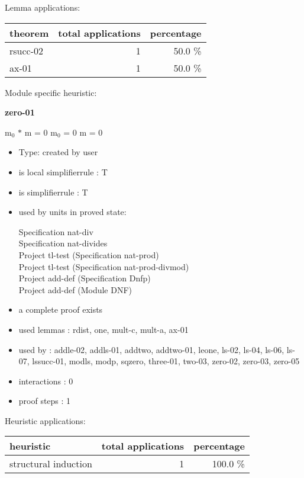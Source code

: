 \documentclass[a4paper]{article}
\begin{document}
Lemma applications:

\begin{supertabular}{l|r|r}
theorem	        & total applications & percentage \\ \hline
rsucc-02 & 1 & 50.0 \% \\
ax-01 & 1 & 50.0 \% \\

\end{supertabular}

Module specific heuristic:

\pagebreak

{\LARGE\bf zero-01}\label{lemma-zero-01}

\medskip

 \Fol $\mbox{m}_{0}$ $*$ m = 0 \Equiv $\mbox{m}_{0}$ = 0 \Or m = 0

\begin{itemize}

\item Type: created by user

\item is local simplifierrule : T
\item is simplifierrule : T
\item used by units in proved state:

Specification nat-div \\
Specification nat-divides \\
Project tl-test (Specification nat-prod) \\
Project tl-test (Specification nat-prod-divmod) \\
Project add-def (Specification Dnfp) \\
Project add-def (Module DNF)
\item       a complete proof exists
\item       used lemmas  : rdist, one, mult-c, mult-a, ax-01
\item       used by      : addle-02, addls-01, addtwo, addtwo-01, leone, ls-02, ls-04, ls-06, ls-07, lssucc-01, modls, modp, sqzero, three-01, two-03, zero-02, zero-03, zero-05
\item       interactions : 0
\item       proof steps  : 1
\end{itemize}

\medskip


Heuristic applications:

\begin{supertabular}{l|r|r}
heuristic	& total applications & percentage \\ \hline
structural induction & 1 & 100.0 \% \\

\end{supertabular}
\end{document}
